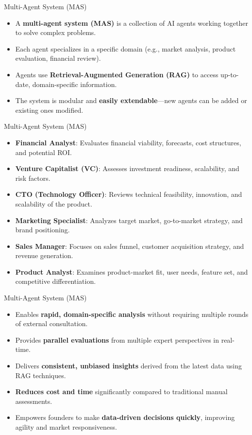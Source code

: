 \documentclass{beamer}
\begin{document}
\begin{frame}{Multi-Agent System (MAS)}
\begin{itemize}
    \item A \textbf{multi-agent system (MAS)} is a collection of AI agents working together to solve complex problems.
    \item Each agent specializes in a specific domain (e.g., market analysis, product evaluation, financial review).
    \item Agents use \textbf{Retrieval-Augmented Generation (RAG)} to access up-to-date, domain-specific information.
    \item The system is modular and \textbf{easily extendable}—new agents can be added or existing ones modified.
  
\end{itemize}
\end{frame}

\begin{frame}{Multi-Agent System (MAS)}
\begin{itemize}
    \item \textbf{Financial Analyst}: Evaluates financial viability, forecasts, cost structures, and potential ROI.
    \item \textbf{Venture Capitalist (VC)}: Assesses investment readiness, scalability, and risk factors.
    \item \textbf{CTO (Technology Officer)}: Reviews technical feasibility, innovation, and scalability of the product.
    \item \textbf{Marketing Specialist}: Analyzes target market, go-to-market strategy, and brand positioning.
    \item \textbf{Sales Manager}: Focuses on sales funnel, customer acquisition strategy, and revenue generation.
    \item \textbf{Product Analyst}: Examines product-market fit, user needs, feature set, and competitive differentiation.
\end{itemize}
\end{frame}


\begin{frame}{Multi-Agent System (MAS)}
\begin{itemize}
    \item Enables \textbf{rapid, domain-specific analysis} without requiring multiple rounds of external consultation.
    \item Provides \textbf{parallel evaluations} from multiple expert perspectives in real-time.
    \item Delivers \textbf{consistent, unbiased insights} derived from the latest data using RAG techniques.
    \item \textbf{Reduces cost and time} significantly compared to traditional manual assessments.
    \item Empowers founders to make \textbf{data-driven decisions quickly}, improving agility and market responsiveness.
\end{itemize}
\end{frame}
\end{document}
